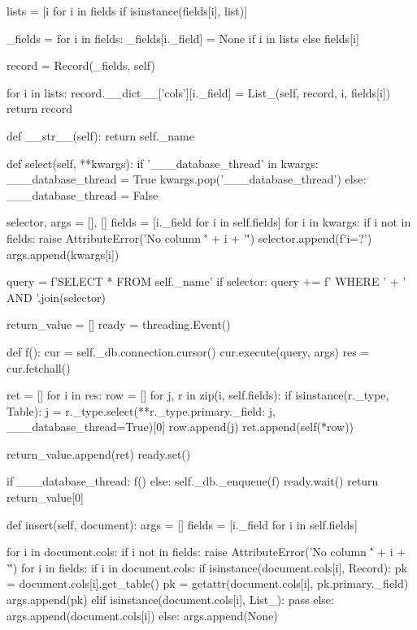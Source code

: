 \begin{pythoncode}
        lists = [i for i in fields if isinstance(fields[i], list)]

        _fields = {}
        for i in fields:
            _fields[i._field] = None if i in lists else fields[i]

        record = Record(_fields, self)

        for i in lists:
            record.__dict__['cols'][i._field] = List_(self, record, i, fields[i])
        return record

    def __str__(self):
        return self._name
    
    def select(self, **kwargs):
        if '___database_thread' in kwargs:
            ___database_thread = True
            kwargs.pop('___database_thread')
        else:
            ___database_thread = False
        
        selector, args = [], []
        fields = [i._field for i in self.fields]
        for i in kwargs:
            if i not in fields:
                raise AttributeError('No column \'' + i + '\'')
            selector.append(f'{i}=?')
            args.append(kwargs[i])

        query = f'SELECT * FROM {self._name}'
        if selector:
            query += f' WHERE ' + ' AND '.join(selector)

        return_value = []
        ready = threading.Event()

        def f():
            cur = self._db.connection.cursor()
            cur.execute(query, args)
            res = cur.fetchall()

            ret = []
            for i in res:
                row = []
                for j, r in zip(i, self.fields):
                    if isinstance(r._type, Table):
                        j = r._type.select(**{r._type.primary._field: j}, ___database_thread=True)[0]
                    row.append(j)
                ret.append(self(*row))

            return_value.append(ret)
            ready.set()
        
        if ___database_thread:
            f()
        else:
            self._db._enqueue(f)
            ready.wait()
        return return_value[0]
    
    def insert(self, document):
        args = []
        fields = [i._field for i in self.fields]
        
        for i in document.cols:
            if i not in fields:
                raise AttributeError('No column \'' + i + '\'')
        for i in fields:
            if i in document.cols:
                if isinstance(document.cols[i], Record):
                    pk = document.cols[i].get_table()
                    pk = getattr(document.cols[i], pk.primary._field)
                    args.append(pk)
                elif isinstance(document.cols[i], List_):
                    pass
                else:
                    args.append(document.cols[i])
            else:
                args.append(None)


\end{pythoncode}
